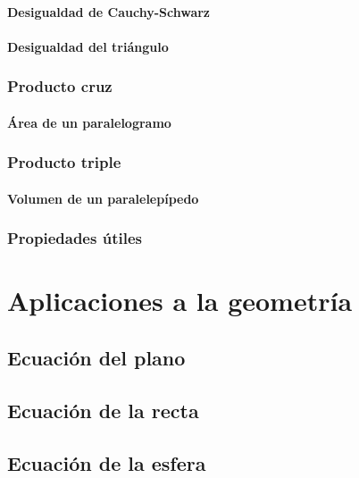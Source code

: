 \documentclass[12pt, fleqn]{report}                             %
\begin{document}
				\subsubsection{Desigualdad de Cauchy-Schwarz}
				
				\subsubsection{Desigualdad del triángulo}
			
			\subsection{Producto cruz}
			
				\subsubsection{Área de un paralelogramo}
			
			\subsection{Producto triple}
			
				\subsubsection{Volumen de un paralelepípedo}
				
			\subsection{Propiedades útiles}
			
	\chapter{Aplicaciones a la geometría}
		
		\section{Ecuación del plano}
			
		\section{Ecuación de la recta}
		
		\section{Ecuación de la esfera}
			
\end{document}
